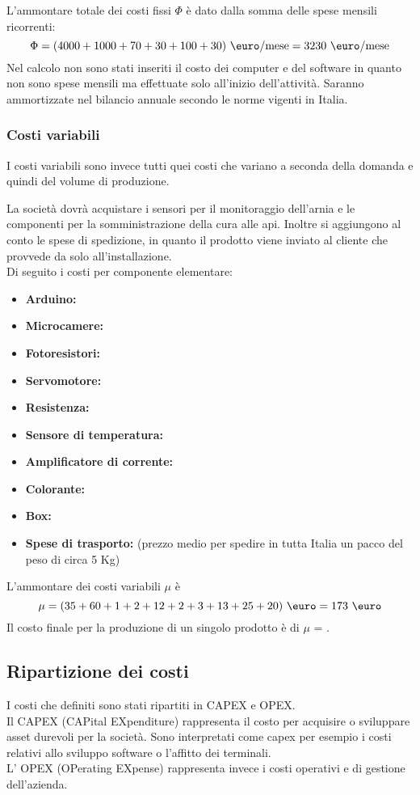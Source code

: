 L’ammontare totale dei costi fissi $\Phi$ è dato dalla somma delle spese mensili
ricorrenti:
\begin{displaymath}
\Phi = (4000 + 1000 + 70 + 30 + 100 + 30) \ \mbox{\euro/mese} = 3230 \ 
\mbox{\euro/mese}
\end{displaymath}
Nel calcolo non sono stati inseriti il costo dei computer e del software in
quanto non sono spese mensili ma effettuate solo all’inizio dell’attività.
Saranno ammortizzate nel bilancio annuale secondo le norme vigenti in Italia.
%
\subsubsection{Costi variabili}
I costi variabili sono invece tutti quei costi che variano a seconda della
domanda e quindi del volume di produzione.

La società dovrà acquistare i sensori per il monitoraggio dell’arnia e le
componenti per la somministrazione della cura alle api. Inoltre si aggiungono al
conto le spese di spedizione, in quanto il prodotto viene inviato al cliente che
provvede da solo all’installazione.\\
%
Di seguito i costi per componente elementare:
\begin{itemize}
\item \textbf{Arduino: }
\item \textbf{Microcamere: }
\item \textbf{Fotoresistori: }
\item \textbf{Servomotore: }
\item \textbf{Resistenza: }
\item \textbf{Sensore di temperatura: }
\item \textbf{Amplificatore di corrente: }
\item \textbf{Colorante: }
\item \textbf{Box: }
\item \textbf{Spese di trasporto: } (prezzo medio per spedire in tutta
Italia un pacco del peso di circa 5 Kg)
\end{itemize}
L’ammontare dei costi variabili $\mu$ è
\begin{displaymath}
\mu= (35 + 60 + 1 + 2 + 12 + 2 + 3 + 13 + 25 + 20) \ \mbox{\euro} = 173
\ \mbox{\euro}
\end{displaymath}
Il costo finale per la produzione di un singolo prodotto è di $\mu$ = .
\subsection{Ripartizione dei costi}
I costi che definiti sono stati ripartiti in CAPEX e OPEX.\\
Il CAPEX (CAPital EXpenditure) rappresenta il costo per acquisire o sviluppare
asset durevoli per la società. Sono interpretati come capex per esempio i costi
relativi allo sviluppo software o l’affitto dei terminali.\\
L’ OPEX (OPerating EXpense) rappresenta invece i costi operativi e di gestione
dell’azienda.


